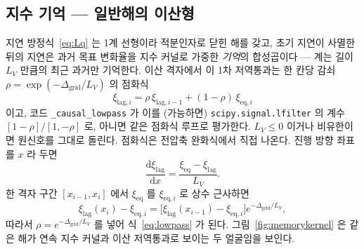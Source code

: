 \documentclass[11pt,a4paper]{article}
\newcommand{\dd}{\mathrm{d}}
\newcommand{\eq}{\mathrm{eq}}
\newcommand{\code}[1]{\texttt{#1}}
\begin{document}
\subsection{지수 기억 — 일반해의 이산형}
지연 방정식~\eqref{eq:Lq} 는 1계 선형이라 적분인자로 닫힌 해를 갖고, 초기 지연이 사멸한 뒤의 지연은 과거 목표 변화율을
지수 커널로 가중한 \emph{기억}의 합성곱이다 — 계는 길이 $L_{V}$ 만큼의 최근 과거만 기억한다. 이산 격자에서 이 1차
저역통과는 한 칸당 감쇠 $\rho=\exp(-\Delta_\mathrm{grid}/L_V)$ 의 점화식
\begin{equation}
\xi_{\mathrm{lag},i}=\rho\,\xi_{\mathrm{lag},i-1}+(1-\rho)\,\xi_{\eq,i}
\label{eq:lowpass}
\end{equation}
이고, 코드 \code{\_causal\_lowpass} 가 이를 (가능하면) \code{scipy.signal.lfilter} 의 계수
$[1-\rho]/[1,-\rho]$ 로, 아니면 같은 점화식 루프로 평가한다. $L_V\le0$ 이거나 비유한이면 원신호를 그대로 돌린다.
점화식은 전압축 완화식에서 직접 나온다. 진행 방향 좌표를 $x$ 라 두면
\begin{equation}
\frac{\dd\xi_\mathrm{lag}}{\dd x}
=\frac{\xi_\eq-\xi_\mathrm{lag}}{L_V}.
\label{eq:lag_ode_v809}
\end{equation}
한 격자 구간 $[x_{i-1},x_i]$ 에서 $\xi_\eq$ 를 $\xi_{\eq,i}$ 로 상수 근사하면
\begin{equation}
\xi_\mathrm{lag}(x_i)-\xi_{\eq,i}
=\big[\xi_\mathrm{lag}(x_{i-1})-\xi_{\eq,i}\big]e^{-\Delta_\mathrm{grid}/L_V},
\label{eq:lag_step_solve_v809}
\end{equation}
따라서 $\rho=e^{-\Delta_\mathrm{grid}/L_V}$ 를 넣어 식~\eqref{eq:lowpass} 가 된다. 그림~\ref{fig:memorykernel} 은 같은 해가
연속 지수 커널과 이산 저역통과로 보이는 두 얼굴임을 보인다.
\end{document}
